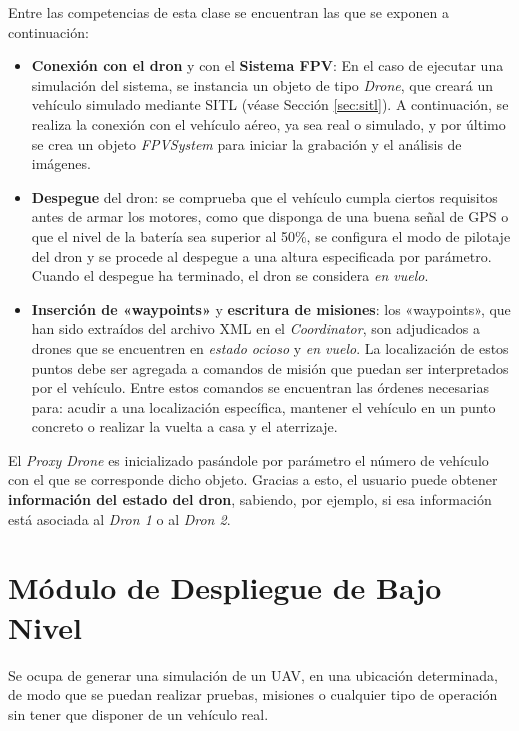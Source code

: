 Entre las competencias de esta clase se encuentran las que se exponen a continuación:

\begin{itemize}
\item \textbf{Conexión con el dron} y con el \textbf{Sistema \acs{FPV}}: En el caso de ejecutar una simulación del sistema, se instancia un objeto de tipo \textit{Drone}, que creará un vehículo simulado mediante \acs{SITL} (véase Sección \ref{sec:sitl}). A continuación, se realiza la conexión con el vehículo aéreo, ya sea real o simulado, y por último se crea un objeto \textit{FPVSystem} para iniciar la grabación y el análisis de imágenes.
\item \textbf{Despegue} del dron: se comprueba que el vehículo cumpla ciertos requisitos antes de armar los motores, como que disponga de una buena señal de \acs{GPS} o que el nivel de la batería sea superior al 50\%, se configura el modo de pilotaje del dron y se procede al despegue a una altura especificada por parámetro. Cuando el despegue ha terminado, el dron se considera \textit{en vuelo}. 
\item \textbf{Inserción de «waypoints»} y \textbf{escritura de misiones}: los «waypoints», que han sido extraídos del archivo XML en el \textit{Coordinator}, son adjudicados a drones que se encuentren en \textit{estado ocioso} y \textit{en vuelo}. La localización de estos puntos debe ser agregada a comandos de misión que puedan ser interpretados por el vehículo. Entre estos comandos se encuentran las órdenes necesarias para: acudir a una localización específica, mantener el vehículo en un punto concreto o realizar la vuelta a casa y el aterrizaje.
\end{itemize}

El \textit{Proxy Drone} es inicializado pasándole por parámetro el número de vehículo con el que se corresponde dicho objeto. Gracias a esto, el usuario puede obtener \textbf{información del estado del dron}, sabiendo, por ejemplo, si esa información está asociada al \textit{Dron 1} o al \textit{Dron 2}.

\clearpage

\section{Módulo de Despliegue de Bajo Nivel}

Se ocupa de generar una simulación de un \acs{UAV}, en una ubicación determinada, de modo que se puedan realizar pruebas, misiones o cualquier tipo de operación sin tener que disponer de un vehículo real.

